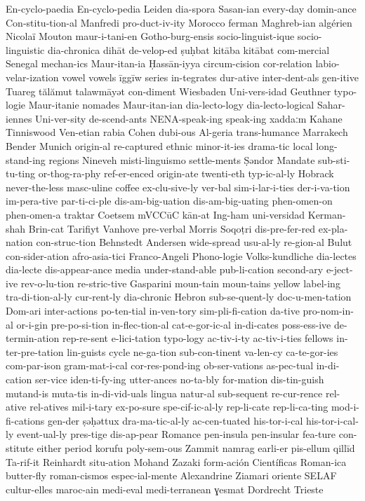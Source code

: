 {En-cyclo-paedia
En-cyclo-pedia
Leiden
dia-spora
Sasan-ian
every-day
domin-ance
Con-stitu-tion-al
Manfredi
pro-duct-iv-ity
Morocco
ferman
Maghreb-ian
algérien
Nicolaï
Mouton
maur-i-tani-en
Gotho-burg-ensis
socio-linguist-ique
socio-linguistic
dia-chronica
dihāt
de-velop-ed
ṣuḥbat
kitāba
kitābat
com-mercial
Senegal
mechan-ics
Maur-itan-ia
Ḥassān-iyya
circum-cision
cor-relation
labio-velar-ization
vowel
vowels
īggīw
series
in-tegrates
dur-ative
inter-dent-als
gen-itive
Tuareg
tălămut
talawmāyət
con-diment
Wiesbaden
Uni-vers-idad
Geuthner
typo-logie
Maur-itanie
nomades
Maur-itan-ian
dia-lecto-logy
dia-lecto-logical
Sahar-iennes
Uni-ver-sity
de-scend-ants
NENA-speak-ing
speak-ing
xaddaːm
Kahane
Tinniswood
Ven-etian
rabia
Cohen
dubi-ous
Al-geria
trans-humance
Marrakech
Bender
Munich
origin-al
re-captured
ethnic
minor-it-ies
drama-tic
local
long-stand-ing
regions
Nineveh
misti-linguismo
settle-ments
Ṣəndor
Mandate
sub-sti-tu-ting
or-thog-ra-phy
ref-er-enced
origin-ate
twenti-eth
typ-ic-al-ly
Hobrack
never-the-less
masc-uline
coffee
ex-clu-sive-ly
ver-bal
sim-i-lar-i-ties
der-i-va-tion
im-pera-tive
par-ti-ci-ple
dis-am-big-uation
dis-am-big-uating
phen-omen-on
phen-omen-a
traktar
Coetsem
mVCCūC
kān-at
Ing-ham
uni-versidad
Kerman-shah
Brin-cat
Tarifiyt
Vanhove
pre-verbal
Morris
Soqoṭri
dis-pre-fer-red
ex-pla-nation
con-struc-tion
Behnstedt
Andersen
wide-spread
usu-al-ly
re-gion-al
Bulut
con-sider-ation
afro-asia-tici
Franco-Angeli
Phono-logie
Volks-kundliche
dia-lectes
dia-lecte
dis-appear-ance
media
under-stand-able
pub-li-cation
second-ary
e-ject-ive
rev-o-lu-tion
re-stric-tive
Gasparini
moun-tain
moun-tains
yellow
label-ing
tra-di-tion-al-ly
cur-rent-ly
dia-chronic
Hebron
sub-se-quent-ly
doc-u-men-tation
Dom-ari
inter-actions
po-ten-tial
in-ven-tory
sim-pli-fi-cation
da-tive
pro-nom-in-al
or-i-gin
pre-po-si-tion
in-flec-tion-al
cat-e-gor-ic-al
in-di-cates
poss-ess-ive
de-termin-ation
rep-re-sent
e-lici-tation
typo-logy
ac-tiv-i-ty
ac-tiv-i-ties
fellows
in-ter-pre-tation
lin-guists
cycle
ne-ga-tion
sub-con-tinent
va-len-cy
ca-te-gor-ies
com-par-ison
gram-mat-i-cal
cor-res-pond-ing
ob-ser-vations
as-pec-tual
in-di-cation
ser-vice
iden-ti-fy-ing
utter-ances
no-ta-bly
for-mation
dis-tin-guish
mutand-is
muta-tis
in-di-vid-uals
lingua
natur-al
sub-sequent
re-cur-rence
rel-ative
rel-atives
mil-i-tary
ex-po-sure
spe-cif-ic-al-ly
rep-li-cate
rep-li-ca-ting
mod-i-fi-cations
gen-der
ṣəḥəttux
dra-ma-tic-al-ly
ac-cen-tuated
his-tor-i-cal
his-tor-i-cal-ly
event-ual-ly
pres-tige
dis-ap-pear
Romance
pen-insula
pen-insular
fea-ture
con-stitute
either
period
korufu
poly-sem-ous
Zammit
namrag
earli-er
pis-ellum
qillīd
Ta-rif-it
Reinhardt
situ-ation
Mohand
Zazaki
form-ación
Científicas
Roman-ica
butter-fly
roman-cismos
espec-ial-mente
Alexandrine
Ziamari
oriente
SELAF
cultur-elles
maroc-ain
medi-eval
medi-terranean
ɣesmat
Dordrecht
Trieste
}